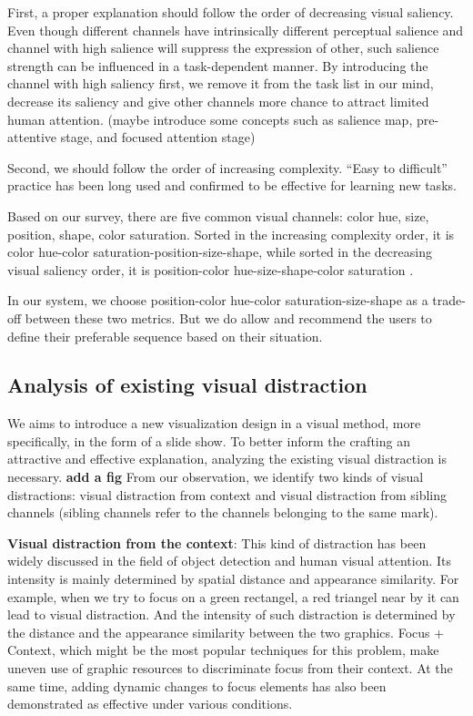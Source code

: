First, a proper explanation should follow the order of decreasing visual saliency.\cite{cleveland_graphical_1984} Even though different channels have intrinsically different perceptual salience and channel with high salience will suppress the expression of other, such salience strength can be influenced in a task-dependent manner. \cite{nothdurft_salience_2000} By introducing the channel with high saliency first, we remove it from the task list in our mind, decrease its saliency and give other channels more chance to attract limited human attention. (maybe introduce some concepts such as salience map, pre-attentive stage, and focused attention stage) \par
 Second, we should follow the order of increasing complexity. “Easy to difficult” practice has been long used and confirmed to be effective for learning new tasks\cite{bliss_effects_1992}.\par
 Based on our survey, there are five common visual channels: color hue, size, position, shape, color saturation. Sorted in the increasing complexity order, it is color hue-color saturation-position-size-shape, while sorted in the decreasing visual saliency order, it is position-color hue-size-shape-color saturation \cite{munzner_visualization_2014,cleveland_graphical_1984}.  \par
In our system, we choose position-color hue-color saturation-size-shape as a trade-off between these two metrics. But we do allow and recommend the users to define their preferable sequence based on their situation. 

\subsection{Analysis of existing visual distraction}
We aims to introduce a new visualization design in a visual method, more specifically, in the form of a slide show. To better inform the crafting an attractive and effective explanation, analyzing the existing visual distraction is necessary. 
\textbf{add a fig}
From our observation, we identify two kinds of visual distractions: visual distraction from context and visual distraction from sibling channels (sibling channels refer to the channels belonging to the same mark). \par
\textbf{Visual distraction from the context}: This kind of distraction has been widely discussed in the field of object detection and human visual attention. \cite{nothdurft_salience_2000, standage_modelling_2005}Its intensity is mainly  determined by spatial distance and appearance similarity. \cite{wolfe_guided_1994}For example, when we try to focus on a green rectangel, a red triangel near by it can lead to visual distraction. And the intensity of such distraction is determined by the distance and the appearance similarity between the two graphics. Focus + Context, which might be the most popular techniques for this problem, make uneven use of graphic resources to discriminate focus from their context. At the same time, adding dynamic changes to focus elements has also been demonstrated as effective under various conditions\cite{waldner_attractive_2014}. 

